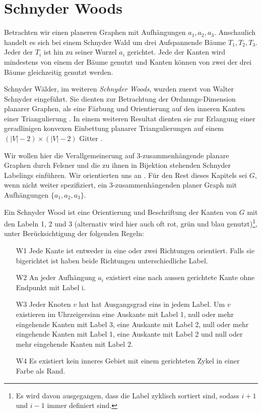 \section{Schnyder Woods}\label{sw}
Betrachten wir einen planeren Graphen mit Aufhängungen $a_1,a_2,a_3$. Anschaulich handelt es sich bei einem Schnyder Wald um drei Aufspannende Bäume $T_1,T_2,T_3$. Jeder der $T_i$ ist hin zu seiner Wurzel $a_i$ gerichtet. Jede der Kanten wird mindestens von einem der Bäume genutzt und Kanten können von zwei der drei Bäume gleichzeitig genutzt werden.

Schnyder Wälder, im weiteren \textit{Schnyder Woods}, wurden zuerst von Walter Schnyder eingeführt. Sie dienten zur Betrachtung der Ordnungs-Dimension planarer Graphen, als eine Färbung und Orientierung auf den inneren Kanten einer Triangulierung \cite{schnyder89}. In einem weiteren Resultat dienten sie zur Erlangung einer geradlinigen konvexen Einbettung planarer Triangulierungen auf einem $(|V|-2)\times(|V|-2)$ Gitter \cite{schnyder90}.

Wir wollen hier die Verallgemeinerung auf 3-zusammenhängende planare Graphen durch Felsner \cite{felsner01} und die zu ihnen in Bijektion stehenden Schnyder Labelings einführen. Wir orientierten uns an \cite{felsner04}. Für den Rest dieses Kapitels sei $G$, wenn nicht weiter spezifiziert, ein 3-zusammenhängenden planer Graph mit Aufhängungen $\{a_1,a_2,a_3\}$.

\begin{definition}\label{def_sw}
Ein Schnyder Wood ist eine Orientierung und Beschriftung der Kanten von $G$ mit den Labeln 1, 2 und 3 (alternativ wird hier auch oft rot, grün und blau genutzt)\footnote{Es wird davon ausgegangen, dass die Label zyklisch sortiert sind, sodass $i+1$ und $i-1$ immer definiert sind.}, unter Berücksichtigung der folgenden Regeln:
\begin{itemize}
\item[W1] Jede Kante ist entweder in eine oder zwei Richtungen orientiert. Falls sie bigerichtet ist haben beide Richtungen unterschiedliche Label.
\item[W2] An jeder Aufhängung  $a_i$ existiert eine nach aussen gerichtete Kante ohne Endpunkt mit Label i.  
\item[W3] Jeder Knoten $v$ hat hat Ausgangsgrad eins in jedem Label. Um $v$ existieren im Uhrzeigersinn eine Auskante mit Label 1, null oder mehr eingehende Kanten mit Label 3, eine Auskante mit Label 2, null oder mehr  eingehende Kanten mit Label 1, eine Auskante mit Label 2 und null oder mehr  eingehende Kanten mit Label 2.
\item[W4] Es existiert kein inneres Gebiet mit einem gerichteten Zykel in einer Farbe als Rand.
\end{itemize}
\end{definition}

